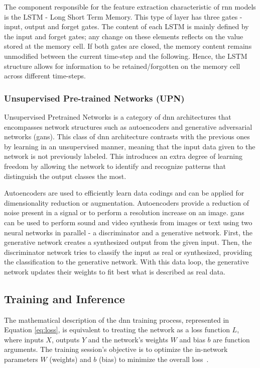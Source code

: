 The component responsible for the feature extraction characteristic of \acrshort{rnn} models is the LSTM - Long Short Term Memory. This type of layer has three gates - input, output and forget gates. The content of each LSTM is mainly defined by the input and forget gates; any change on these elements reflects on the value stored at the memory cell. If both gates are closed, the memory content remains unmodified between the current time-step and the following. Hence, the LSTM structure allows for information to be retained/forgotten on the memory cell across different time-steps.


\subsubsection{Unsupervised Pre-trained Networks (UPN)}
Unsupervised Pretrained Networks is a category of \acrshort{dnn} architectures that encompasses network structures such as autoencoders and generative adversarial networks (\acrshort{gan}s). This class of \acrshort{dnn} architecture contrasts with the previous ones by learning in an unsupervised manner, meaning that the input data given to the network is not previously labeled. This introduces an extra degree of learning freedom by allowing the network to identify and recognize patterns that distinguish the output classes the most.

Autoencoders are used to efficiently learn data codings and can be applied for dimensionality reduction or augmentation. Autoencoders provide a reduction of noise present in a signal or to perform a resolution increase on an image. \acrshort{gan}s can be used to perform sound and video synthesis from images or text using two neural networks in parallel - a discriminator and a generative network. First, the generative network creates a synthesized output from the given input. Then, the discriminator network tries to classify the input as real or synthesized, providing the classification to the generative network. With this data loop, the generative network updates their weights to fit best what is described as real data.


\subsection{Training and Inference}

The mathematical description of the \acrshort{dnn} training process, represented in Equation \ref{eq:loss}, is equivalent to treating the network as a loss function $L$, where inputs $X$, outputs $Y$ and the network's weights $W$ and bias $b$ are function arguments. The training session's objective is to optimize the in-network parameters  $W$ (weights) and $b$ (bias) to minimize the overall loss~\cite{rumelhart_learning_1986-1}.

